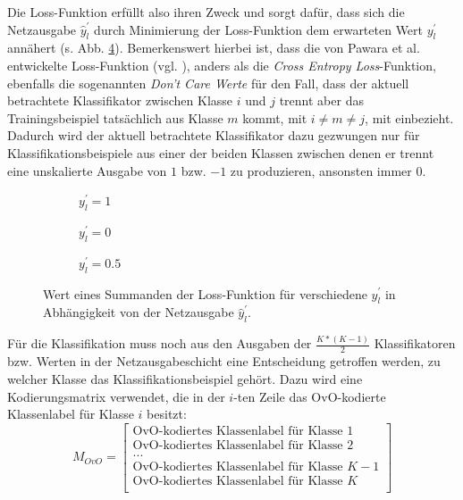 Die Loss-Funktion erfüllt also ihren Zweck und sorgt dafür, dass sich die Netzausgabe $\widehat{y}_{l}^{'}$ durch Minimierung der Loss-Funktion dem erwarteten Wert $y_{l}^{'}$ annähert (s. Abb. \ref{fig:OvOLoss}). Bemerkenswert hierbei ist, dass die von Pawara et al. entwickelte Loss-Funktion (vgl. \cite{pawaraPaper}), anders als die \textit{Cross Entropy Loss}-Funktion, ebenfalls die sogenannten \textit{Don't Care Werte} für den Fall, dass der aktuell betrachtete Klassifikator zwischen Klasse $i$ und $j$ trennt aber das Trainingsbeispiel tatsächlich aus Klasse $m$ kommt, mit $i\neq m \neq j$, mit einbezieht. Dadurch wird der aktuell betrachtete Klassifikator dazu gezwungen nur für Klassifikationsbeispiele aus einer der beiden Klassen zwischen denen er trennt eine unskalierte Ausgabe von $1$ bzw. $-1$ zu produzieren, ansonsten immer $0$.
\begin{figure}[H]
\centering
\begin{subfigure}{.3\textwidth}
\begin{adjustbox}{width=\textwidth, center}

\end{adjustbox}
\caption{$y_l^{'}=1$}
\label{fig:OvOLoss-y1}
\end{subfigure}
\begin{subfigure}{.3\textwidth}
\begin{adjustbox}{width=\textwidth, center}

\end{adjustbox}
\caption{$y_l^{'}=0$}
\label{fig:OvOLoss-y0}
\end{subfigure}
\begin{subfigure}{.3\textwidth}
\begin{adjustbox}{width=\textwidth, center}

\end{adjustbox}
\caption{$y_l^{'}=0.5$}
\label{fig:OvOLoss-y05}
\end{subfigure}
\caption{Wert eines Summanden der Loss-Funktion für verschiedene $y_l^{'}$ in Abhängigkeit von der Netzausgabe $\widehat{y}_l^{'}$.}
\label{fig:OvOLoss}
\end{figure}
Für die Klassifikation muss noch aus den Ausgaben der $\frac{K*(K-1)}{2}$ Klassifikatoren bzw. Werten in der Netzausgabeschicht eine Entscheidung getroffen werden, zu welcher Klasse das Klassifikationsbeispiel gehört.
Dazu wird eine Kodierungsmatrix verwendet, die in der $i$-ten Zeile das OvO-kodierte Klassenlabel für Klasse $i$ besitzt:\\
\[M_{OvO}=
\begin{bmatrix}
\text{OvO-kodiertes Klassenlabel für Klasse } 1 \\ 
\text{OvO-kodiertes Klassenlabel für Klasse } 2 \\ 
... \\
\text{OvO-kodiertes Klassenlabel für Klasse } K-1 \\ 
\text{OvO-kodiertes Klassenlabel für Klasse } K \\ 
\end{bmatrix} 
\]
